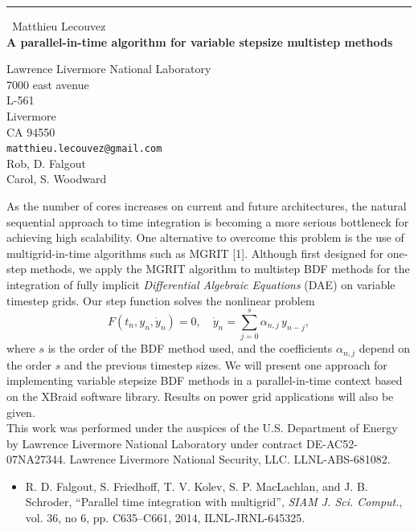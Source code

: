 \documentclass{report}
\begin{document}
\begin{center}
\rule{6in}{1pt} \
{\large Matthieu Lecouvez \\
{\bf A parallel-in-time algorithm for variable stepsize multistep methods}}

Lawrence Livermore National Laboratory \\ 7000 east avenue \\ L-561 \\ Livermore \\ CA 94550
\\
{\tt matthieu.lecouvez@gmail.com}\\
Rob, D. Falgout\\
Carol, S. Woodward\end{center}

As the number of cores increases on current and future architectures, the
natural sequential approach to time integration is becoming a more
serious bottleneck for achieving high scalability. One alternative to
overcome this problem is the use of multigrid-in-time algorithms such as
MGRIT [1]. Although first designed for one-step methods, we apply the
MGRIT algorithm to multistep BDF methods for the integration of fully
implicit {\em Differential Algebraic Equations} (DAE) on variable
timestep grids. Our step function solves the nonlinear problem
\begin{equation}
F\left(t_n,y_n,\dot{y}_n\right)=0,\quad \dot{y}_n=\sum_{j=0}^s \alpha_{n,j}\,y_{n-j},
\end{equation}
where $s$ is the order of the BDF method used, and the coefficients
$\alpha_{n,j}$ depend on the order $s$ and the previous timestep sizes.
We will present one approach for implementing variable stepsize BDF
methods in a parallel-in-time context based on the XBraid software
library. Results on power grid applications will also be given.\\
This work was performed under the auspices of the U.S. Department of
Energy by Lawrence Livermore National Laboratory under contract
DE-AC52-07NA27344. Lawrence Livermore National Security, LLC.
LLNL-ABS-681082.
\begin{itemize}
\item[1] R. D. Falgout, S. Friedhoff, T. V. Kolev, S. P. MacLachlan, and
J. B. Schroder, ``Parallel time integration with multigrid'', {\em SIAM
J. Sci. Comput.}, vol. 36, no 6, pp. C635--C661, 2014, ILNL-JRNL-645325.
\end{itemize}
\end{document}
